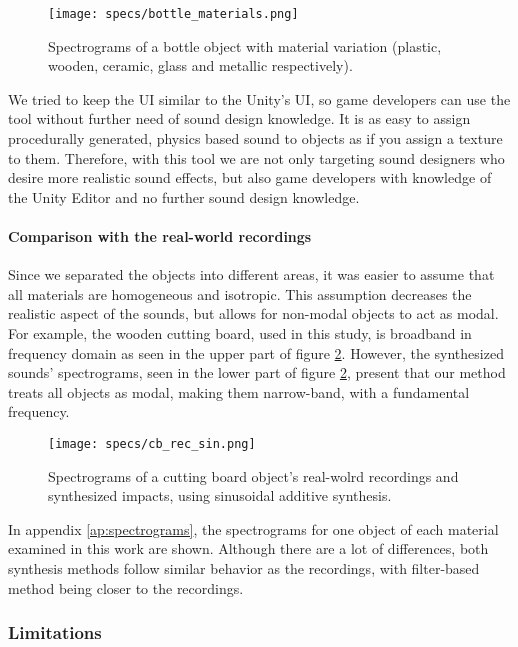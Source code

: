 \begin{figure}[H]
  \centering
    \texttt{[image: specs/bottle\_materials.png]}
      \caption{Spectrograms of a bottle object with material variation (plastic, wooden, ceramic, glass and metallic respectively).}
      \label{fig:bottle_materials}
\end{figure}

We tried to keep the \gls{UI} similar to the Unity\textsuperscript{\textregistered}'s \gls{UI}, so game developers can use the tool without further need of sound design knowledge. It is as easy to assign procedurally generated, physics based sound to objects as if you assign a texture to them. Therefore, with this tool we are not only targeting sound designers who desire more realistic sound effects, but also game developers with knowledge of the Unity\textsuperscript{\textregistered} Editor and no further sound design knowledge. 

\paragraph{Comparison with the real-world recordings\\}
Since we separated the objects into different areas, it was easier to assume that all materials are homogeneous and isotropic. This assumption decreases the realistic aspect of the sounds, but allows for non-modal objects to act as modal. For example, the wooden cutting board, used in this study, is broadband in frequency domain as seen in the upper part of figure \ref{fig:specs_cb}. However, the synthesized sounds' spectrograms, seen in the lower part of figure \ref{fig:specs_cb}, present that our method treats all objects as modal, making them narrow-band, with a fundamental frequency.  

\begin{figure}[H]
  \centering
    \texttt{[image: specs/cb\_rec\_sin.png]}
      \caption{Spectrograms of a cutting board object's real-wolrd recordings and synthesized impacts, using sinusoidal additive synthesis.}
      \label{fig:specs_cb}
\end{figure}

In appendix \ref{ap:spectrograms}, the spectrograms for one object of each material examined in this work are shown. Although there are a lot of differences, both synthesis methods follow similar behavior as the recordings, with filter-based method being closer to the recordings.  

\subsubsection{Limitations}

